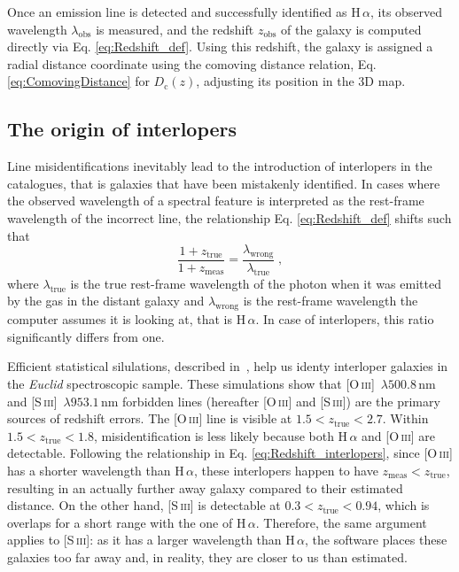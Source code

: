 \documentclass[12pt,a4paper,oneside]{report}
\begin{document}
Once an emission line is detected and successfully identified as $\mathrm{H}\,\alpha$, its observed wavelength $\lambda_{\text{obs}}$ is measured, and the redshift $z_\mathrm{obs}$ of the galaxy is computed directly via Eq. \eqref{eq:Redshift_def}. Using this redshift, the galaxy is assigned a radial distance coordinate using the comoving distance relation, Eq. \eqref{eq:ComovingDistance} for $D_\mathrm{c}(z)$, adjusting its position in the 3D map.

\subsection{The origin of interlopers}\label{subsec:TheOriginOfInterlopers}
Line misidentifications inevitably lead to the introduction of interlopers in the catalogues, that is galaxies that have been mistakenly identified. In cases where the observed wavelength of a spectral feature is interpreted as the rest-frame wavelength of the incorrect line, the relationship Eq. \eqref{eq:Redshift_def} shifts such that
\begin{equation}
  \frac{1 + z_\mathrm{true}}{1 + z_\mathrm{meas}} = \frac{\lambda_\mathrm{wrong}}{\lambda_\mathrm{true}} \; ,
  \label{eq:Redshift_interlopers}
\end{equation}
where $\lambda_\mathrm{true}$ is the true rest-frame wavelength of the photon when it was emitted by the gas in the distant galaxy and  $\lambda_\mathrm{wrong}$ is the rest-frame wavelength the computer assumes it is looking at, that is $\mathrm{H}\,\alpha$. In case of interlopers, this ratio significantly differs from one.

Efficient statistical silulations, described in~\cite{IlariaR}, help us identy interloper galaxies in the \textit{Euclid} spectroscopic sample. These simulations show that [O\,\textsc{iii}]~$\lambda 500.8 \,\mathrm{nm}$ and [S\,\textsc{iii}]~$\lambda 953.1 \,\mathrm{nm}$ forbidden lines (hereafter [O\,\textsc{iii}] and [S\,\textsc{iii}]) are the primary sources of redshift errors. The [O\,\textsc{iii}] line is visible at $1.5 < z_\mathrm{true} < 2.7$. Within $1.5 < z_\mathrm{true} < 1.8$, misidentification is less likely because both $\mathrm{H}\,\alpha$ and [O\,\textsc{iii}] are detectable. Following the relationship in Eq. \eqref{eq:Redshift_interlopers}, since [O\,\textsc{iii}] has a shorter wavelength than $\mathrm{H}\,\alpha$, these interlopers happen to have $z_\mathrm{meas} < z_\mathrm{true}$, resulting in an actually further away galaxy compared to their estimated distance. On the other hand, [S\,\textsc{iii}] is detectable at $0.3 < z_\mathrm{true} < 0.94$, which is overlaps for a short range with the one of $\mathrm{H}\,\alpha$. Therefore, the same argument applies to [S\,\textsc{iii}]: as it has a larger wavelength than $\mathrm{H}\,\alpha$, the software places these galaxies too far away and, in reality, they are closer to us than estimated.
\end{document}
